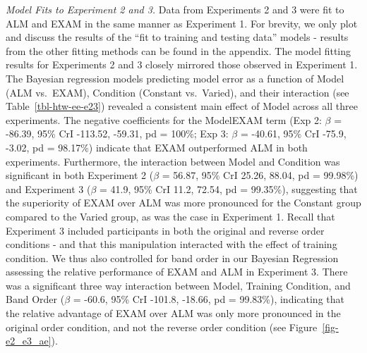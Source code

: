 \documentclass[
  11pt,
  letterpaper,
]{article}
\begin{document}
\endgroup

\normalsize

\emph{Model Fits to Experiment 2 and 3.} Data from Experiments 2 and 3
were fit to ALM and EXAM in the same manner as Experiment 1. For
brevity, we only plot and discuss the results of the ``fit to training
and testing data'' models - results from the other fitting methods can
be found in the appendix. The model fitting results for Experiments 2
and 3 closely mirrored those observed in Experiment 1. The Bayesian
regression models predicting model error as a function of Model (ALM
vs.~EXAM), Condition (Constant vs.~Varied), and their interaction (see
Table~\ref{tbl-htw-ee-e23}) revealed a consistent main effect of Model
across all three experiments. The negative coefficients for the
ModelEXAM term (Exp 2: \(\beta\) = -86.39, 95\% CrI -113.52, -59.31, pd
= 100\%; Exp 3: \(\beta\) = -40.61, 95\% CrI -75.9, -3.02, pd = 98.17\%)
indicate that EXAM outperformed ALM in both experiments. Furthermore,
the interaction between Model and Condition was significant in both
Experiment 2 (\(\beta\) = 56.87, 95\% CrI 25.26, 88.04, pd = 99.98\%)
and Experiment 3 (\(\beta\) = 41.9, 95\% CrI 11.2, 72.54, pd = 99.35\%),
suggesting that the superiority of EXAM over ALM was more pronounced for
the Constant group compared to the Varied group, as was the case in
Experiment 1. Recall that Experiment 3 included participants in both the
original and reverse order conditions - and that this manipulation
interacted with the effect of training condition. We thus also
controlled for band order in our Bayesian Regression assessing the
relative performance of EXAM and ALM in Experiment 3. There was a
significant three way interaction between Model, Training Condition, and
Band Order (\(\beta\) = -60.6, 95\% CrI -101.8, -18.66, pd = 99.83\%),
indicating that the relative advantage of EXAM over ALM was only more
pronounced in the original order condition, and not the reverse order
condition (see Figure~\ref{fig-e2_e3_ae}).
\end{document}
